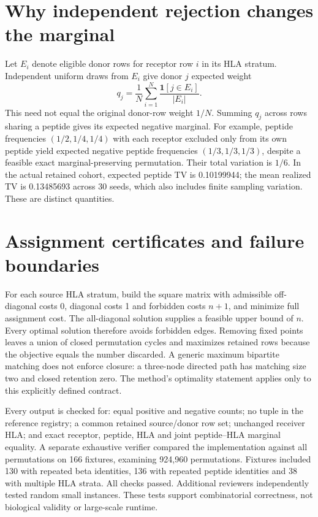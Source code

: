 \documentclass[11pt,a4paper]{article}
\begin{document}
\section{Why independent rejection changes the marginal}
Let $E_i$ denote eligible donor rows for receptor row $i$ in its HLA stratum. Independent uniform draws from $E_i$ give donor $j$ expected weight
\begin{equation}
q_j=\frac{1}{N}\sum_{i=1}^N\frac{\mathbf{1}[j\in E_i]}{|E_i|}.
\end{equation}
This need not equal the original donor-row weight $1/N$. Summing $q_j$ across rows sharing a peptide gives its expected negative marginal. For example, peptide frequencies $(1/2,1/4,1/4)$ with each receptor excluded only from its own peptide yield expected negative peptide frequencies $(1/3,1/3,1/3)$, despite a feasible exact marginal-preserving permutation. Their total variation is $1/6$. In the actual retained cohort, expected peptide TV is 0.10199944; the mean realized TV is 0.13485693 across 30 seeds, which also includes finite sampling variation. These are distinct quantities.

\section{Assignment certificates and failure boundaries}
For each source HLA stratum, build the square matrix with admissible off-diagonal costs 0, diagonal costs 1 and forbidden costs $n+1$, and minimize full assignment cost. The all-diagonal solution supplies a feasible upper bound of $n$. Every optimal solution therefore avoids forbidden edges. Removing fixed points leaves a union of closed permutation cycles and maximizes retained rows because the objective equals the number discarded. A generic maximum bipartite matching does not enforce closure: a three-node directed path has matching size two and closed retention zero. The method's optimality statement applies only to this explicitly defined contract.

Every output is checked for: equal positive and negative counts; no tuple in the reference registry; a common retained source/donor row set; unchanged receiver HLA; and exact receptor, peptide, HLA and joint peptide--HLA marginal equality. A separate exhaustive verifier compared the implementation against all permutations on 166 fixtures, examining 924,960 permutations. Fixtures included 130 with repeated beta identities, 136 with repeated peptide identities and 38 with multiple HLA strata. All checks passed. Additional reviewers independently tested random small instances. These tests support combinatorial correctness, not biological validity or large-scale runtime.
\end{document}
